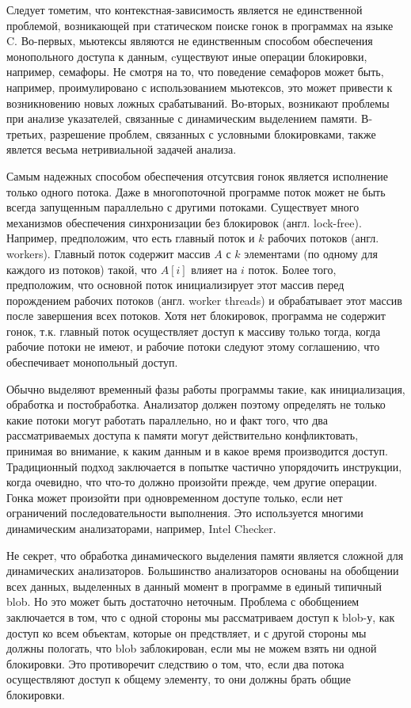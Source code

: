 Следует тометим, что контекстная-зависимость является не единственной проблемой, возникающей при статическом поиске гонок в программах на языке C. Во-первых, мьютексы являются не единственным способом обеспечения монопольного доступа к данным, cуществуют иные операции блокировки, например, семафоры. Не смотря на то, что поведение семафоров может быть, например, проимулировано с использованием мьютексов, это может привести к возникновению новых ложных срабатываний. Во-вторых, возникают проблемы при анализе указателей, связанные с динамическим выделением памяти. В-третьих, разрешение проблем, связанных с условными блокировками, также явлется весьма нетривиальной задачей анализа.

Самым надежных способом обеспечения отсутсвия гонок является исполнение только одного потока. Даже в многопоточной программе поток может не быть  всегда запущенным параллельно с другими потоками. Существует много механизмов обеспечения синхронизации без блокировок (англ. lock-free). Например, предположим, что есть главный поток и $k$ рабочих потоков (англ. workers). Главный поток содержит массив $A$ с $k$ элементами (по одному для каждого из потоков) такой, что $A[i]$ влияет на $i$ поток. Более того, предположим, что основной поток инициализирует этот массив перед порождением рабочих потоков (англ. worker threads) и обрабатывает этот массив после завершения всех потоков. Хотя нет блокировок, программа не содержит гонок, т.к. главный поток осуществляет доступ к массиву только тогда, когда рабочие потоки не имеют, и рабочие потоки следуют этому соглашению, что обеспечивает монопольный доступ.

Обычно выделяют временный фазы работы программы такие, как инициализация, обработка и постобработка. Анализатор должен поэтому определять не только какие потоки могут работать параллельно, но и факт того, что два рассматриваемых доступа к памяти могут действительно конфликтовать, принимая во внимание, к каким данным и в какое время производится доступ. Традиционный подход заключается в попытке частично упорядочить инструкции, когда очевидно, что что-то должно произойти прежде, чем другие операции. Гонка может произойти при одновременном доступе только, если нет ограничений последовательности выполнения. Это используется многими динамическим анализаторами, например, Intel Checker.

Не секрет, что обработка динамического выделения памяти является сложной для динамических анализаторов. Большинство анализаторов основаны на обобщении всех данных, выделенных в данный момент в программе в единый типичный blob. Но это может быть достаточно неточным. Проблема с обобщением заключается в том, что с одной стороны мы рассматриваем доступ к blob-у, как доступ ко всем объектам, которые он предствляет, и с другой стороны мы должны пологать, что blob заблокирован, если мы не можем взять ни одной блокировки. Это противоречит следствию о том, что, если два потока  осуществляют доступ к общему элементу, то они должны брать общие блокировки.

